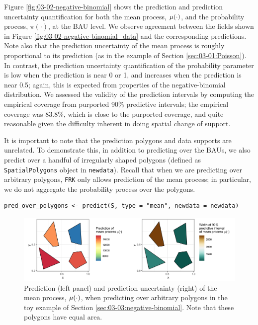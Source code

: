 \documentclass[12pt,a4paper]{article}
\begin{document}
Figure \ref{fig:03-02-negative-binomial} shows the prediction and prediction uncertainty quantification for both the mean process, $\mu(\cdot)$, and the probability process, $\pi(\cdot)$, at the BAU level. 
We observe agreement between the fields shown in Figure \ref{fig:03-02-negative-binomial_data} and the corresponding predictions.  
Note also that the prediction uncertainty of the mean process is roughly proportional to its prediction (as in the example of Section \ref{sec:03-01:Poisson}). 
In contrast, the prediction uncertainty quantification of the probability parameter is low when the prediction is near 0 or 1, and increases when the prediction is near 0.5; again, this is expected from properties of the negative-binomial distribution. 
 We assessed the validity of the prediction intervals by computing the empirical coverage from purported 90\% predictive intervals; the empirical coverage was 83.8\%, which is close to the purported coverage, and quite reasonable given the difficulty inherent in doing spatial change of support.




It is important to note that the prediction polygons and data supports are unrelated.
To demonstrate this, in addition to predicting over the BAUs, we also predict over a handful of irregularly shaped polygons (defined as \texttt{SpatialPolygons} object in \texttt{newdata}). 
Recall that when we are predicting over arbitrary polygons, \texttt{FRK} only allows prediction of the mean process; in particular, we do not aggregate the probability process over the polygons. 

\begin{lstlisting}[style=R]
pred_over_polygons <- predict(S, type = "mean", newdata = newdata)
\end{lstlisting}

\begin{figure}[t!]
    \centering
    \includegraphics[width = \linewidth]{Images/03-02-negative_binomial_spatialCOS_polygons.png}
    \caption{Prediction (left panel) and prediction uncertainty (right) of the mean process, $\mu(\cdot)$, when predicting over arbitrary polygons in the toy example of Section \ref{sec:03-03:negative-binomial}. Note that these polygons have equal area.}   
  \label{fig:03-02-negative-binomial_polygons}
\end{figure}
\end{document}
